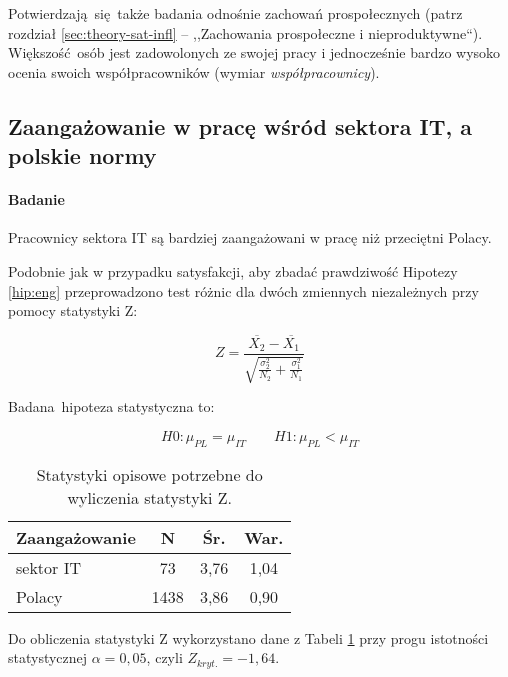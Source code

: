 Potwierdzają się także badania odnośnie zachowań prospołecznych (patrz rozdział \ref{sec:theory-sat-infl} -- ,,Zachowania prospołeczne i nieproduktywne``). Większość osób jest zadowolonych ze swojej pracy i jednocześnie bardzo wysoko ocenia swoich współpracowników (wymiar \textit{współpracownicy}).
\subsection{Zaangażowanie w pracę wśród sektora IT, a polskie normy}
\paragraph{Badanie}
\begin{hyp}
  Pracownicy sektora IT są bardziej zaangażowani w pracę niż przeciętni Polacy.
  \label{hip:eng}
\end{hyp}

Podobnie jak w przypadku satysfakcji, aby zbadać prawdziwość Hipotezy \ref{hip:eng} przeprowadzono test różnic dla dwóch zmiennych niezależnych przy pomocy statystyki Z:

\begin{equation}
  Z = \frac{\overline{X_2} - \overline{X_1}}{\sqrt{\frac{\sigma^2_2}{N_2}+\frac{\sigma^2_1}{N_1}}}
\end{equation}

Badana hipoteza statystyczna  to:

\begin{equation}
  H0: \mu_{PL} = \mu_{IT} \qquad H1: \mu_{PL} < \mu_{IT}
\end{equation}

\begin{table}[h!b]
  \begin{center}
    \begin{tabular}{l | c c c }
      Zaangażowanie & N & Śr. & War. \\ \hline
      sektor IT & 73 & 3,76 & 1,04 \\
      Polacy & 1438 & 3,86 & 0,90 \\
    \end{tabular}
  \end{center}
  \caption{Statystyki opisowe potrzebne do wyliczenia statystyki Z.}
  \label{tab:uwes-norms-data}
\end{table}

Do obliczenia statystyki Z wykorzystano dane z Tabeli \ref{tab:uwes-norms-data} przy progu istotności statystycznej $\alpha = 0,05$, czyli $Z_{kryt.} = -1,64$.

